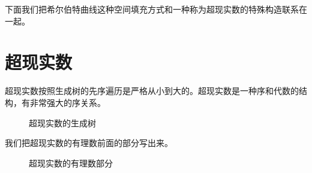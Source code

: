 \documentclass[a4paper,12pt]{article}
\begin{document}
下面我们把希尔伯特曲线这种空间填充方式和一种称为超现实数的特殊构造联系在一起。

\newpage

\section{超现实数}

超现实数按照生成树的先序遍历是严格从小到大的。超现实数是一种序和代数的结构，有非常强大的序关系。

\begin{figure}[ht]
\centering
{}
\caption{超现实数的生成树}
\end{figure}

我们把超现实数的有理数前面的部分写出来。

\begin{figure}[ht]
\centering
{}
\caption{超现实数的有理数部分}
\end{figure}
\end{document}
